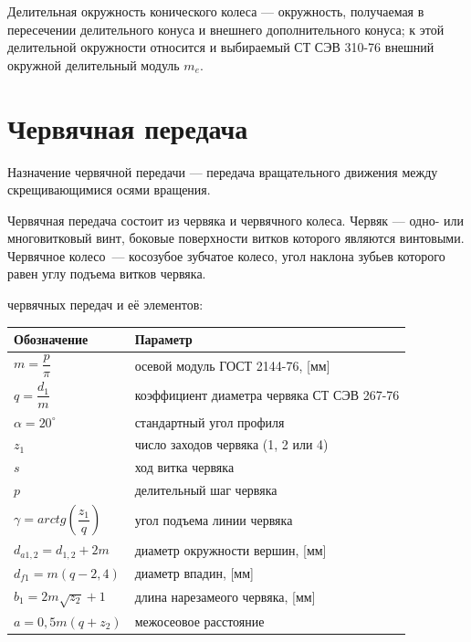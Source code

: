 \documentclass{tufte-book}
\begin{document}
Делительная окружность конического колеса --- окружность, получаемая в пересечении делительного конуса и внешнего дополнительного конуса; к этой делительной окружности относится и выбираемый СТ СЭВ 310-76 внешний окружной делительный модуль $ m_e $. 

\chapter{Червячная передача}
\label{ch:chervak}

Назначение червячной передачи --- передача вращательного движения между скрещивающимися осями вращения.

Червячная передача состоит из червяка и червячного колеса. Червяк --- одно- или многовитковый винт, боковые поверхности витков которого являются винтовыми. Червячное колесо~--- косозубое зубчатое колесо, угол наклона зубьев которого равен углу подъема витков червяка.

 червячных передач и её элементов:
\begin{table}[ht]
	\centering
	\selectfont
	\begin{tabular}{ll}
		\toprule
		Обозначение & Параметр \\ 
		\midrule
		$ m = \dfrac{p}{\pi}$ & осевой модуль ГОСТ 2144-76, [мм] \\
		$ q= \dfrac{d_1}{m} $ & коэффициент диаметра червяка СТ СЭВ 267-76 \\
		$ \alpha = 20^\circ $ & стандартный угол профиля \\
		$ z_1 $ & число заходов червяка (1, 2 или 4) \\
		$ s $ & ход витка червяка \\
		$ p $ & делительный шаг червяка \\
		$ \gamma = arctg(\dfrac{z_1}{q}) $ & угол подъема линии червяка \\
		$ d_{a1,2} = d_{1,2} + 2m $ & диаметр окружности вершин, [мм] \\
		$ d_{f1} = m(q-2,4) $ & диаметр впадин, [мм] \\
		$ b_1 = 2m\sqrt{z_2} + 1 $ & длина нарезамеого червяка, [мм] \\
		$ a = 0,5m(q+z_2) $ & межосеовое расстояние\\
		\bottomrule
	\end{tabular}
	\label{tab:parChervak}
\end{table}
\end{document}
